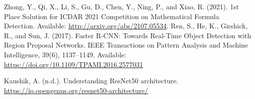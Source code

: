  Zhong, Y., Qi, X., Li, S., Gu, D., Chen, Y., Ning, P., and Xiao, R. (2021). 1st Place Solution for ICDAR 2021 Competition on Mathematical Formula Detection.  Available: \url{http://arxiv.org/abs/2107.05534}.
 Ren, S., He, K., Girshick, R., and Sun, J. (2017). Faster R-CNN: Towards Real-Time Object Detection with Region Proposal Networks. IEEE Transactions on Pattern Analysis and Machine Intelligence, 39(6), 1137–1149. Available: \url{https://doi.org/10.1109/TPAMI.2016.2577031}

 Kaushik, A. (n.d.). Understanding ResNet50 architecture. \url{https://iq.opengenus.org/resnet50-architecture/}